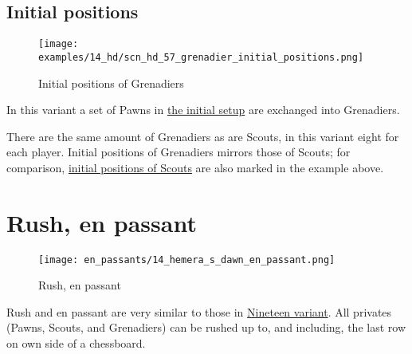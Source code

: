 \clearpage %

\subsection*{Initial positions}
\label{sec:Hemera's Dawn/Grenadier/Initial positions}

\vspace*{-1.2\baselineskip}
\noindent
\begin{figure}[!h]
\texttt{[image: examples/14\_hd/scn\_hd\_57\_grenadier\_initial\_positions.png]}
\vspace*{-1.3\baselineskip}
\caption{Initial positions of Grenadiers}
\label{fig:scn_hd_57_grenadier_initial_positions}
\end{figure}

\vspace*{-0.5\baselineskip}
In this variant a set of Pawns in
\hyperref[fig:14_hemera_s_dawn]{the initial setup} are exchanged into Grenadiers.

There are the same amount of Grenadiers as are Scouts, in this variant eight for
each player. Initial positions of Grenadiers mirrors those of Scouts; for comparison,
\hyperref[fig:scn_hd_39_scout_initial_positions]{initial positions of Scouts} are
also marked in the example above.

\clearpage %

\section*{Rush, en passant}
\label{sec:Hemera's Dawn/Rush, en passant}

\vspace*{-1.2\baselineskip}
\noindent
\begin{figure}[!h]
\texttt{[image: en\_passants/14\_hemera\_s\_dawn\_en\_passant.png]}
\vspace*{-1.3\baselineskip}
\caption{Rush, en passant}
\label{fig:14_hemera_s_dawn_en_passant}
\end{figure}

\vspace*{-0.5\baselineskip}
Rush and en passant are very similar to those in
\hyperref[fig:12_nineteen_en_passant]{Nineteen variant}.
All privates (Pawns, Scouts, and Grenadiers) can be rushed up to, and including,
the last row on own side of a chessboard.

